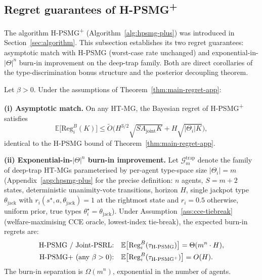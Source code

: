 \subsection{Regret guarantees of H-PSMG\textsuperscript{+}}
\label{sec:hpsmg-plus}

The algorithm H-PSMG\textsuperscript{+} (Algorithm~\ref{alg:hpsmg-plus}) was introduced in Section~\ref{sec:algorithm}. This subsection establishes its two regret guarantees: asymptotic match with H-PSMG (worst-case rate unchanged) and exponential-in-$|\Theta|^n$ burn-in improvement on the deep-trap family. Both are direct corollaries of the type-discrimination bonus structure and the posterior decoupling theorem.

\begin{theorem}
\label{thm:hpsmg-plus-app}
Let $\beta > 0$. Under the assumptions of Theorem~\ref{thm:main-regret-app}:

\textbf{(i) Asymptotic match.} On any HT-MG, the Bayesian regret of H-PSMG\textsuperscript{+} satisfies
\begin{equation}
\mathbb{E}\big[\mathrm{Reg}_i^B(K)\big] \leq \tilde{O}\big(H^{3/2}\sqrt{S A_{\mathrm{joint}} K} + H\sqrt{|\Theta_i| K}\big),
\end{equation}
identical to the H-PSMG bound of Theorem~\ref{thm:main-regret-app}.

\textbf{(ii) Exponential-in-$|\Theta|^n$ burn-in improvement.} Let $\mathcal{G}_m^{\mathrm{trap}}$ denote the family of deep-trap HT-MGs parameterised by per-agent type-space size $|\Theta_i| = m$ (Appendix~\ref{app:hpsmg-plus} for the precise definition: $n$ agents, $S = m+2$ states, deterministic unanimity-vote transitions, horizon $H$, single jackpot type $\theta_{\mathrm{jack}}$ with $r_i(s^\star, a, \theta_{\mathrm{jack}}) = 1$ at the rightmost state and $r_i = 0.5$ otherwise, uniform prior, true types $\theta_i^\star = \theta_{\mathrm{jack}}$). Under Assumption~\ref{ass:cce-tiebreak} (welfare-maximising CCE oracle, lowest-index tie-break), the expected burn-in regrets are:
\begin{align}
\textnormal{H-PSMG / Joint-PSRL:} \quad &\mathbb{E}\big[\mathrm{Reg}_i^B(\tau_{\textnormal{H-PSMG}})\big] = \Theta(m^n \cdot H), \\
\textnormal{H-PSMG\textsuperscript{+} (any } \beta > 0\textnormal{):} \quad &\mathbb{E}\big[\mathrm{Reg}_i^B(\tau_{\textnormal{H-PSMG}^+})\big] = O(H).
\end{align}
The burn-in separation is $\Omega(m^n)$, exponential in the number of agents.
\end{theorem}

